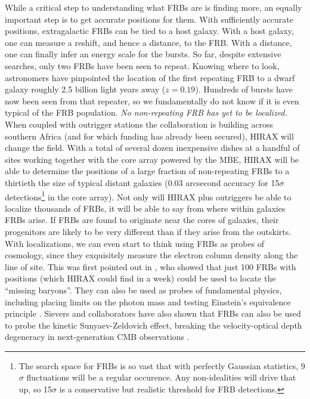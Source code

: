 \documentclass[letterpaper,11pt,preprint]{aastex}
\newcommand{\mbe}{{\rm MBE}}
\begin{document}
While a critical step to understanding what FRBs are is finding more,
an equally important step is to get accurate positions for them.  With
sufficiently accurate positions, extragalactic FRBs can be tied to a
host galaxy.  With a host galaxy, one can measure a reshift, and hence
a distance, to the FRB.  With a distance, one can finally infer an
energy scale for the bursts.  So far, despite extensive searches, only
two FRBs have been seen to repeat.  Knowing where to look, astronomers
have pinpointed the location of the first repeating FRB to a dwarf
galaxy roughly 2.5 billion light years away ($z=0.19$).  Hundreds of
bursts have now been seen from that repeater, so we fundamentally do
not know if it is even typical of the FRB population.  {\textit{No
    non-repeating FRB has yet to be localized.}}  When coupled with
outrigger stations the collaboration is building across southern
Africa (and for which funding has already been secured), HIRAX will
change the field.  With a total of several dozen inexpensive dishes at
a handful of sites working together with the core array powered by the
\mbe, HIRAX will be able to determine the positions of a large
fraction of non-repeating FRBs to a thirtieth the size of typical
distant galaxies (0.03 arcsecond accuracy for 15$\sigma$
detections\footnote{The search space for FRBs is so vast that with
  perfectly Gaussian statistics, 9$\sigma$ fluctuations will be a
  regular occurence.  Any non-idealities will drive that up, so
  15$\sigma$ is a conservative but realistic threshold for FRB
  detections.} in the core array).  Not only will HIRAX plus
outriggers be able to localize thousands of FRBs, it will be able to
say from where within galaxies FRBs arise.  If FRBs are found to
originate near the cores of galaxies, their progenitors are likely to
be very different than if they arise from the outskirts.  With
localizations, we can even start to think using FRBs as probes of
cosmology, since they exquisitely measure the electron column density
along the line of site. This was first pointed out in
\citet{McQuinn2014}, who showed that just 100 FRBs with positions
(which HIRAX could find in a week) could be used to locate the
``missing baryons''.  They can also be used as probes of fundamental
physics, including placing limits on the photon mass
\citep{bonetti2017} and testing Einstein's equivalence principle
\citep{frb_equivalence}.  Sievers and collaborators have also shown
that FRBs can also be used to probe the kinetic Sunyaev-Zeldovich
effect, breaking the velocity-optical depth degeneracy in
next-generation CMB observations \citep{Madhavacheril18}.
\end{document}
